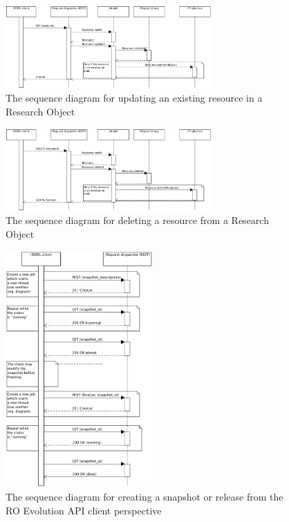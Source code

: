 \begin{figure}[!h]
\centering
\includegraphics[width=0.7\textwidth]{Figures/RODL/ResourceUpdate.png}
\caption{The sequence diagram for updating an existing resource in a Research Object}
\label{ResourceUpdate}
\end{figure}

\begin{figure}[!h]
\centering
\includegraphics[width=0.7\textwidth]{Figures/RODL/ResourceDelete.png}
\caption{The sequence diagram for deleting a resource from a Research Object}
\label{ResourceDelete}
\end{figure}

\begin{figure}[!h]
\centering
\includegraphics[width=0.5\textwidth]{Figures/RODL/SnapshotClient.png}
\caption{The sequence diagram for creating a snapshot or release from the RO Evolution API client perspective}
\label{SnapshotClient}
\end{figure}

